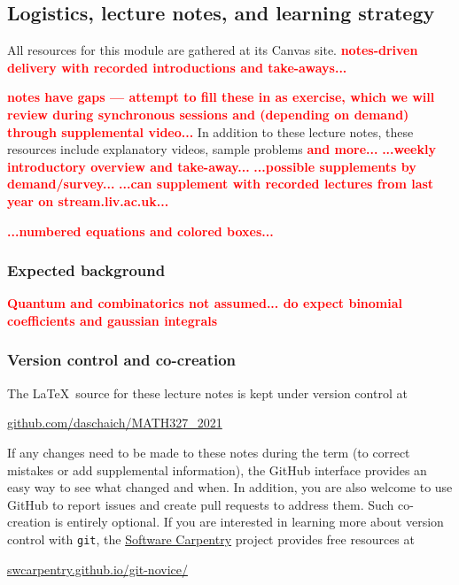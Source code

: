 \documentclass[12 pt]{article}
\newcommand{\TODO}[1]{\textcolor{red}{\textbf{#1}}}
\begin{document}
\subsection*{Logistics, lecture notes, and learning strategy}
All resources for this module are gathered at its Canvas site.
\TODO{notes-driven delivery with recorded introductions and take-aways...}{
\TODO{notes have gaps --- attempt to fill these in as exercise, which we will review during synchronous sessions and (depending on demand) through supplemental video...}
In addition to these lecture notes, these resources include explanatory videos, sample problems \TODO{and more...}
\TODO{...weekly introductory overview and take-away...}
\TODO{...possible supplements by demand/survey...} %
\TODO{...can supplement with recorded lectures from last year on stream.liv.ac.uk...}

\TODO{...numbered equations and colored boxes...}

\subsubsection*{Expected background}
\TODO{Quantum and combinatorics not assumed... do expect binomial coefficients and gaussian integrals}

\subsubsection*{Version control and co-creation}
The \LaTeX\ source for these lecture notes is kept under version control at \\
\centerline{\href{https://github.com/daschaich/MATH327_2021}{github.com/daschaich/MATH327\_2021}}
If any changes need to be made to these notes during the term (to correct mistakes or add supplemental information), the GitHub interface provides an easy way to see what changed and when.
In addition, you are also welcome to use GitHub to report issues and create pull requests to address them.
Such co-creation is entirely optional.
If you are interested in learning more about version control with \texttt{git}, the \href{https://software-carpentry.org}{Software Carpentry} project provides free resources at \\
\centerline{\href{https://swcarpentry.github.io/git-novice/}{swcarpentry.github.io/git-novice/}}



}
\end{document}
